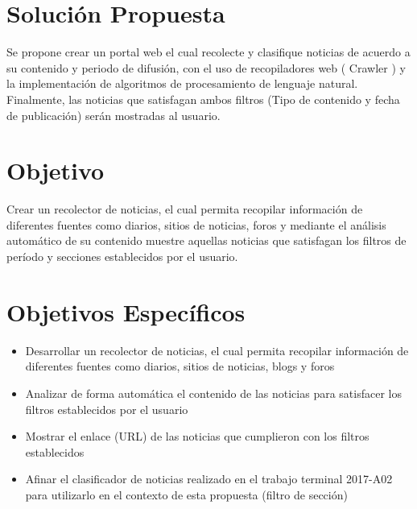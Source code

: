 \section{Solución Propuesta}

Se propone crear un portal web el cual recolecte y clasifique noticias de acuerdo 
a su contenido y periodo de difusión, con el uso de recopiladores web ( Crawler ) y la implementación de algoritmos de procesamiento de lenguaje natural. Finalmente, las noticias
que satisfagan ambos filtros (Tipo de contenido y fecha de publicación) serán mostradas al usuario.

\section{Objetivo}

  Crear un recolector de noticias, el cual permita recopilar información de diferentes fuentes como diarios, sitios de noticias, foros y mediante el análisis automático de su contenido muestre aquellas noticias que satisfagan los filtros de período y secciones establecidos por el usuario.
  

\section{Objetivos Específicos}
\begin{itemize}
  \item Desarrollar un recolector de noticias, el cual permita recopilar información de diferentes fuentes como diarios, sitios de noticias, blogs y foros
  \item Analizar de forma automática el contenido de las noticias para satisfacer los filtros establecidos por el usuario
  \item Mostrar el enlace (URL) de las noticias que cumplieron con los filtros establecidos
  \item Afinar el clasificador de noticias realizado en el trabajo terminal 2017-A02 para utilizarlo en el contexto de esta propuesta (filtro de sección) 

\end{itemize}